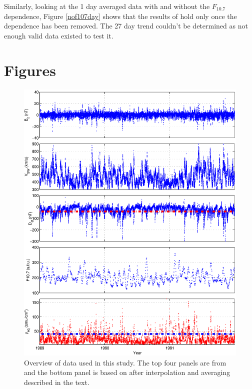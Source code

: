 \documentclass[10pt,twocolumn]{article}
\begin{document}
Similarly, looking at the 1 day averaged data with and without the $F_{10.7}$ dependence, Figure \ref{nof107day} shows that the results of \cite{Takahashi2010} hold only once the dependence has been removed. The 27 day trend couldn't be determined as not enough valid data existed to test it.



\newpage
\footnotesize




\section{Figures}

\begin{figure}[htp]
\centering
\includegraphics[scale=0.7]{paperfigures/alldata.eps}
\caption{Overview of data used in this study. The top four panels are from \cite{Reconstruction} and the bottom panel is based on \cite{Denton} after interpolation and averaging described in the text.}
\label{AllData}
\end{figure}
\clearpage
\end{document}
